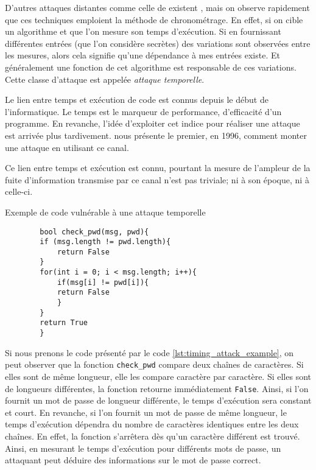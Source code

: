 D'autres attaques distantes comme celle de \citeauthor{LLC_attack} existent \cite{cryptoeprint:2016/224,Moghimi_2017,vanbulck2018nemesis}, mais on observe rapidement que ces techniques emploient la méthode de chronométrage. En effet, si on cible un algorithme et que l'on mesure son temps d'exécution. Si en fournissant différentes entrées (que l'on considère secrètes) des variations sont observées entre les mesures, alors cela signifie qu'une dépendance à mes entrées existe. Et généralement une fonction de cet algorithme est responsable de ces variations. Cette classe d'attaque est appelée \textit{attaque temporelle}.\medbreak


Le lien entre temps et exécution de code est connus depuis le début de l'informatique. Le temps est le marqueur de performance, d'efficacité d'un programme. En revanche, l'idée d'exploiter cet indice pour réaliser une attaque est arrivée plus tardivement. \citeauthor{crypto-1996-1469} nous présente le premier, en 1996, comment monter une attaque en utilisant ce canal.\medbreak

Ce lien entre temps et exécution est connu, pourtant la mesure de l'ampleur de la fuite d'information transmise par ce canal n'est pas triviale; ni à son époque, ni à celle-ci.

\begin{listing}[!ht]
    \caption{Exemple de code vulnérable à une attaque temporelle}
    \label{lst:timing_attack_example}
    \begin{verbatim}
        bool check_pwd(msg, pwd){
        if (msg.length != pwd.length){
            return False
        }
        for(int i = 0; i < msg.length; i++){
            if(msg[i] != pwd[i]){
            return False
            }
        }
        return True
        }
    \end{verbatim}
\end{listing}
                
Si nous prenons le code présenté par le code \ref{lst:timing_attack_example}, on peut observer que la fonction \texttt{check\_pwd} compare deux chaînes de caractères. Si elles sont de même longueur, elle les compare caractère par caractère. Si elles sont de longueurs différentes, la fonction retourne immédiatement \texttt{False}. Ainsi, si l'on fournit un mot de passe de longueur différente, le temps d'exécution sera constant et court. En revanche, si l'on fournit un mot de passe de même longueur, le temps d'exécution dépendra du nombre de caractères identiques entre les deux chaînes. En effet, la fonction s'arrêtera dès qu'un caractère différent est trouvé. Ainsi, en mesurant le temps d'exécution pour différents mots de passe, un attaquant peut déduire des informations sur le mot de passe correct.\medbreak

